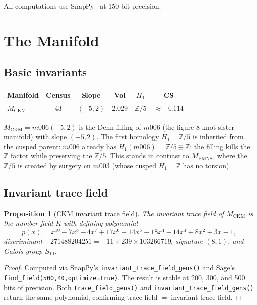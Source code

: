 \documentclass[11pt,a4paper]{article}
\newtheorem{proposition}[theorem]{Proposition}
\theoremstyle{remark}
\newcommand{\MCKM}{M_{\mathrm{CKM}}}
\newcommand{\MPMNS}{M_{\mathrm{PMNS}}}
\newcommand{\Zfive}{\mathbb{Z}/5}
\newcommand{\ZZ}{\mathbb{Z}}
\begin{document}
All computations use SnapPy~\cite{SnapPy} at 150-bit precision.

\section{The Manifold}
\label{sec:manifold}

\subsection{Basic invariants}

\begin{center}
\begin{tabular}{lcccccc}
\toprule
Manifold & Census & Slope & Vol & $H_1$ & CS \\
\midrule
$\MCKM$ & 43 & $(-5,2)$ & $2.029$ & $\Zfive$ & $\approx-0.114$ \\
\bottomrule
\end{tabular}
\end{center}

$\MCKM = m006(-5,2)$ is the Dehn filling of $m006$ (the figure-8
knot sister manifold) with slope $(-5,2)$.
The first homology $H_1 = \Zfive$ is inherited from the cusped parent:
$m006$ already has $H_1(m006) = \Zfive \oplus \ZZ$; the filling
kills the $\ZZ$ factor while preserving the $\Zfive$.
This stands in contrast to $\MPMNS$, where the $\Zfive$ is created
by surgery on $m003$ (whose cusped $H_1 = \ZZ$ has no torsion).

\subsection{Invariant trace field}

\begin{proposition}[CKM invariant trace field]
\label{prop:itf}
The invariant trace field of $\MCKM$ is the number field $K$ with
defining polynomial
\begin{equation}
p(x) = x^{10}-7x^8-4x^7+17x^6+14x^5-18x^4-14x^3+8x^2+3x-1,
\label{eq:itf}
\end{equation}
discriminant $-271488204251 = -11\times239\times103266719$,
signature $(8,1)$, and Galois group $S_{10}$.
\end{proposition}

\begin{proof}
Computed via SnapPy's \texttt{invariant\_trace\_field\_gens()}
and Sage's \texttt{find\_field(500,40,optimize=True)}.
The result is stable at 200, 300, and 500 bits of precision.
Both \texttt{trace\_field\_gens()} and \texttt{invariant\_trace\_field\_gens()}
return the same polynomial, confirming trace field $=$ invariant
trace field.
\end{proof}
\end{document}
